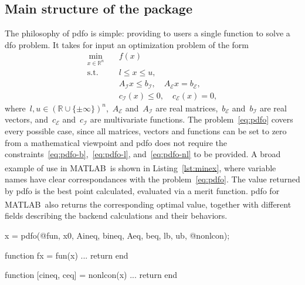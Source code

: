\documentclass[11pt,draft]{article}
\numberwithin{equation}{section}
\def\R{\ensuremath{\mathds{R}}}
\newcommand\set[2][]{#1\{#2#1\}}
\def\obj{\ensuremath{f}}
\def\bl{\ensuremath{l}}
\def\bu{\ensuremath{u}}
\newcommand\cgen[1][i]{c_{#1}}
\def\ceq{\ensuremath{\cgen[\scriptscriptstyle\mathcal{E}]}}
\def\cub{\ensuremath{\cgen[\scriptscriptstyle\mathcal{I}]}}
\def\aeq{\ensuremath{A_{\scriptscriptstyle\mathcal{E}}}}
\def\beq{\ensuremath{b_{\scriptscriptstyle\mathcal{E}}}}
\def\aub{\ensuremath{A_{\scriptscriptstyle\mathcal{I}}}}
\def\bub{\ensuremath{b_{\scriptscriptstyle\mathcal{I}}}}
\def\matlab{\mbox{MATLAB\textsuperscript{\textregistered}}}
\begin{document}
\subsection{Main structure of the package}

The philosophy of \gls{pdfo} is simple: providing to users a single function to solve a \gls{dfo} problem.
It takes for input an optimization problem of the form
\begin{subequations}
    \label{eq:pdfo}
    \begin{align}
        \min_{x \in \R^n}   & \quad \obj(x)\\
        \text{s.t.}         & \quad \bl \le x \le \bu, \label{eq:pdfo-b}\\
        & \quad \aub x \le \bub, \quad \aeq x = \beq, \label{eq:pdfo-l}\\
        & \quad \cub(x) \le 0, \quad \ceq(x) = 0, \label{eq:pdfo-nl}
    \end{align}
\end{subequations}
where~$\bl, \bu \in (\R \cup \set{\pm \infty})^n$,~$\aeq$ and~$\aub$ are real matrices,~$\beq$ and~$\bub$ are real vectors, and~$\ceq$ and~$\cub$ are multivariate functions.
The problem~\eqref{eq:pdfo} covers every possible case, since all matrices, vectors and functions can be set to zero from a mathematical viewpoint and \gls{pdfo} does not require the constraints~\eqref{eq:pdfo-b},~\eqref{eq:pdfo-l}, and~\eqref{eq:pdfo-nl} to be provided.
A broad example of use in \matlab\ is shown in Listing~\ref{lst:minex}, where variable names have clear correspondances with the problem~\eqref{eq:pdfo}.
The value returned by \gls{pdfo} is the best point calculated, evaluated via a merit function.
\gls{pdfo} for \matlab\ also returns the corresponding optimal value, together with different fields describing the backend calculations and their behaviors.

\begin{matlablst}[%
    caption=An elementary example of PDFO in \matlab.,
    label=lst:minex
]
    x = pdfo(@fun, x0, Aineq, bineq, Aeq, beq, lb, ub, @nonlcon);

    function fx = fun(x)
    ...
    return
    end

    function [cineq, ceq] = nonlcon(x)
    ...
    return
    end
\end{matlablst}
\end{document}
